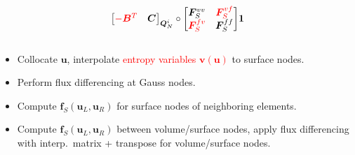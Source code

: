 \documentclass[compress]{beamer}
\theoremstyle{plain}
\renewcommand{\note}[1]{\textcolor{red}{{#1}}}
\begin{document}
{\begin{columns}
\begin{column}{.5\textwidth}
\[{{{\begin{bmatrix}
\note{-\bm{B}^T} & \bm{C}
\end{bmatrix}}_{\bm{Q}_N^i} \circ
\begin{bmatrix}
\bm{F}^{vv}_S & \note{\bm{F}^{vf}_S}\\
\note{\bm{F}^{fv}_S} & \bm{F}^{ff}_S
\end{bmatrix} } \bm{1}
}
\]
\end{column}
\end{columns}
\begin{itemize}
\item<1-> Collocate $\bm{u}$, interpolate \note{entropy variables $\bm{v}(\bm{u})$} to surface nodes.  
\vspace{.25em}
\item<2-> Perform flux differencing at Gauss nodes.
\vspace{.25em}
\item<3-> Compute $\bm{f}_S(\bm{u}_L,\bm{u}_R)$ for surface nodes of neighboring elements.
\vspace{.25em}
\item<4-> Compute $\bm{f}_S(\bm{u}_L,\bm{u}_R)$ between volume/surface nodes, apply flux differencing with interp.\ matrix + transpose for volume/surface nodes.
\end{itemize} 
}
\end{document}
